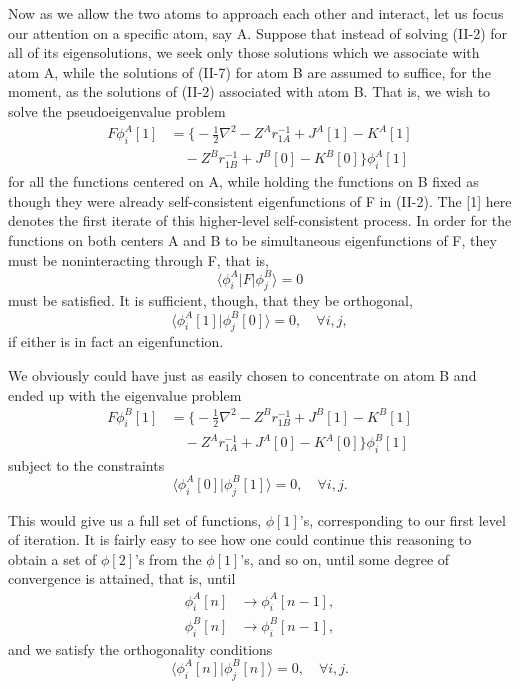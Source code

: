 \documentclass[12pt,letterpaper]{report}
\begin{document}
Now as we allow the two atoms to approach each other and interact, let us focus our attention on a specific atom, say A. Suppose that instead of solving (II-2) for all of its eigensolutions, we seek only those solutions which we associate with atom A, while the solutions of (II-7) for atom B are assumed to suffice, for the moment, as the solutions of (II-2) associated with atom B. That is, we wish to solve the pseudoeigenvalue problem
\begin{align}
F \phi_i^A[1] &= \bigg\{-\frac{1}{2}\nabla^2 - Z^A r_{1A}^{-1} + J^A[1] - K^A[1] \nonumber\\
&\quad - Z^B r_{1B}^{-1} + J^B[0] - K^B[0]\bigg\} \phi_i^A[1]
\end{align}
for all the functions centered on A, while holding the functions on B fixed as though they were already self-consistent eigenfunctions of F in (II-2). The [1] here denotes the first iterate of this higher-level self-consistent process. In order for the functions on both centers A and B to be simultaneous eigenfunctions of F, they must be noninteracting through F, that is,
\begin{equation}
\langle \phi_i^A | F | \phi_j^B \rangle = 0
\end{equation}
must be satisfied. It is sufficient, though, that they be orthogonal,
\begin{equation}
\langle \phi_i^A[1] | \phi_j^B[0] \rangle = 0, \quad \forall i,j,
\end{equation}
if either is in fact an eigenfunction.

We obviously could have just as easily chosen to concentrate on atom B and ended up with the eigenvalue problem
\begin{align}
F \phi_i^B[1] &= \bigg\{-\frac{1}{2}\nabla^2 - Z^B r_{1B}^{-1} + J^B[1] - K^B[1] \nonumber\\
&\quad - Z^A r_{1A}^{-1} + J^A[0] - K^A[0]\bigg\} \phi_i^B[1]
\end{align}
subject to the constraints
\begin{equation}
\langle \phi_i^A[0] | \phi_j^B[1] \rangle = 0, \quad \forall i,j.
\end{equation}

This would give us a full set of functions, $\phi[1]$'s, corresponding to our first level of iteration. It is fairly easy to see how one could continue this reasoning to obtain a set of $\phi[2]$'s from the $\phi[1]$'s, and so on, until some degree of convergence is attained, that is, until
\begin{align}
\phi_i^A[n] &\rightarrow \phi_i^A[n-1], \nonumber\\
\phi_i^B[n] &\rightarrow \phi_i^B[n-1],
\end{align}
and we satisfy the orthogonality conditions
\begin{equation}
\langle \phi_i^A[n] | \phi_j^B[n] \rangle = 0, \quad \forall i,j.
\end{equation}
\end{document}

